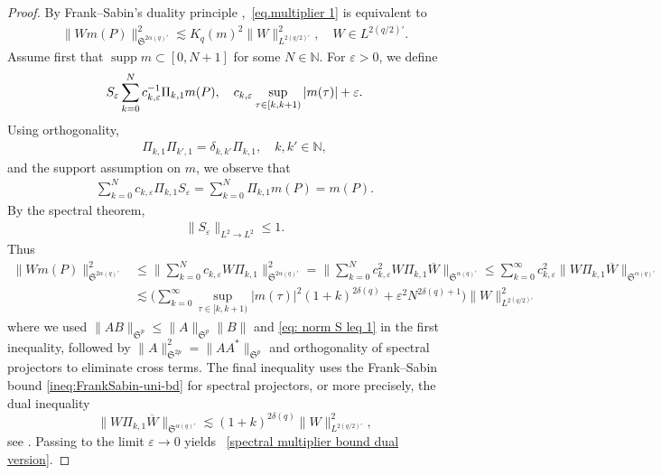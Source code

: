 \documentclass[12pt,reqno,a4paper]{amsart}
\let\coloneq\relax
\newcommand{\coloneq}{\coloneqq}
\newcommand{\N}{{\mathbb N}}
\DeclareMathOperator{\supp}{supp}
\begin{document}
\begin{proof}
  By Frank--Sabin's duality principle \cite[Lemma 3]{FrankSabin-2017rest},~\eqref{eq.multiplier 1} is equivalent to
  \begin{align}\label{spectral multiplier bound dual version}
    \|Wm(P)\|^2_{\mathfrak{S}^{2\alpha(q)'}}\lesssim K_q(m)^2\|W\|^2_{L^{2(q/2)'}} ,\quad W\in L^{2(q/2)'}.
  \end{align}
  Assume first that $\supp m\subset [0,N+1]$ for some $N\in\N$. For $\varepsilon>0$, we define
  \begin{align}
S_\varepsilon\coloneq\sum_{k=0}^Nc_{k,\varepsilon}^{-1}\Pi_{k,1}m(P),\quad c_{k,\varepsilon}\coloneq\sup_{\tau\in [k,k+1)}|m(\tau)|+\varepsilon.
  \end{align}
  Using orthogonality,
  \begin{align}\label{orthogonality}
    \Pi_{k,1}\Pi_{k',1}=\delta_{k,k'}\Pi_{k,1} ,\quad k,k'\in\N ,
  \end{align}
  and the support assumption on $m$,
  we observe that
  \begin{align}
    \sum_{k=0}^Nc_{k,\varepsilon}   \Pi_{k,1} S_\varepsilon=\sum_{k=0}^N\Pi_{k,1}m(P)=m(P).
  \end{align}
  By the spectral theorem,  
  \begin{align}\label{eq: norm S leq 1}
\|S_\varepsilon\|_{L^2\to L^2}\leq 1.    
  \end{align}
  Thus
  \begin{align*}
    \|Wm(P)\|^2_{\mathfrak{S}^{2\alpha(q)'}}
    &\leq \bigg\|\sum_{k=0}^Nc_{k,\varepsilon}   W\Pi_{k,1}\bigg\|^2_{\mathfrak{S}^{2\alpha(q)'}}
    =\bigg\|\sum_{k=0}^Nc_{k,\varepsilon}^2   W\Pi_{k,1}\overline{W}\bigg\|_{\mathfrak{S}^{\alpha(q)'}}
    \leq \sum_{k=0}^{\infty}c_{k,\varepsilon}^2\|W\Pi_{k,1}\overline{W}\|_{\mathfrak{S}^{\alpha(q)'}}\\
    &\lesssim \Big( \sum_{k=0}^{\infty}\sup_{\tau\in[k,k+1)}|m(\tau)|^2(1+k)^{2\delta(q)}+ \varepsilon^2 N^{2\delta(q)+1} \Big) \|W\|^2_{L^{2(q/2)'}}
  \end{align*}
where we used $\|AB\|_{\mathfrak S^p}\leq \|A\|_{\mathfrak S^p}\|B\|$ and \eqref{eq: norm S leq 1} in the first inequality, followed by
\(\|A\|_{\mathfrak S^{2p}}^2=\|AA^*\|_{\mathfrak S^p}\) and orthogonality of spectral projectors to eliminate cross terms. The final inequality
uses the Frank--Sabin bound \eqref{ineq:FrankSabin-uni-bd} for spectral projectors, or more precisely, the dual inequality
\[
\|W\Pi_{k,1}\overline{W}\|_{\mathfrak{S}^{\alpha(q)'}}\lesssim (1+k)^{2\delta(q)}\|W\|^2_{L^{2(q/2)'}},
\]
see \cite[(16)]{FrankSabin-2017clust}. Passing to the limit $\varepsilon\to 0$ yields ~\eqref{spectral multiplier bound dual version}. 


\end{proof}
\end{document}
